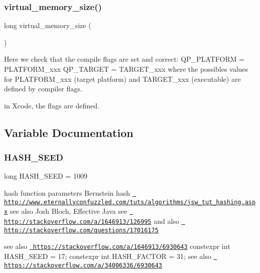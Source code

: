 \subsubsection{\texorpdfstring{virtual\_memory\_size()}{virtual\_memory\_size()}}
{\footnotesize\ttfamily long virtual\+\_\+memory\+\_\+size (\begin{DoxyParamCaption}{ }\end{DoxyParamCaption})}



Here we check that the compile flags are set and correct\+: Q\+P\+\_\+\+P\+L\+A\+T\+F\+O\+RM = P\+L\+A\+T\+F\+O\+R\+M\+\_\+xxx Q\+P\+\_\+\+T\+A\+R\+G\+ET = T\+A\+R\+G\+E\+T\+\_\+xxx where the possibles values for P\+L\+A\+T\+F\+O\+R\+M\+\_\+xxx (target platform) and T\+A\+R\+G\+E\+T\+\_\+xxx (executable) are defined by compiler flags. 

in Xcode, the flags are defined. 

\subsection{Variable Documentation}
\mbox{\label{group__general_gae18ed995d696579fcc6018d8e9993e65}} 
\subsubsection{\texorpdfstring{HASH\_SEED}{HASH\_SEED}\hspace{0.1cm}{\footnotesize\ttfamily [1/2]}}
{\footnotesize\ttfamily long H\+A\+S\+H\+\_\+\+S\+E\+ED = 1009}



hash function parameters Bernstein hash \href{http://www.eternallyconfuzzled.com/tuts/algorithms/jsw_tut_hashing.aspx}{\texttt{ http\+://www.\+eternallyconfuzzled.\+com/tuts/algorithms/jsw\+\_\+tut\+\_\+hashing.\+aspx}} see also Josh Bloch, Effective Java see \href{http://stackoverflow.com/a/1646913/126995}{\texttt{ http\+://stackoverflow.\+com/a/1646913/126995}} and also \href{http://stackoverflow.com/questions/17016175}{\texttt{ http\+://stackoverflow.\+com/questions/17016175}} 

see also \href{https://stackoverflow.com/a/1646913/6930643}{\texttt{ https\+://stackoverflow.\+com/a/1646913/6930643}} constexpr int H\+A\+S\+H\+\_\+\+S\+E\+ED = 17; constexpr int H\+A\+S\+H\+\_\+\+F\+A\+C\+T\+OR = 31; see also \href{https://stackoverflow.com/a/34006336/6930643}{\texttt{ https\+://stackoverflow.\+com/a/34006336/6930643}} \mbox{\label{group__general_gae18ed995d696579fcc6018d8e9993e65}} 
